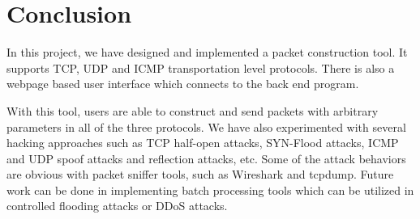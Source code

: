 \documentclass[12pt,letterpaper]{report}
\begin{document}
\chapter*{Conclusion}
In this project, we have designed and implemented a packet 
construction tool. It supports TCP, UDP and ICMP transportation 
level protocols. There is also a webpage based user interface 
which connects to the back end program.

With this tool, users are able to construct and send packets 
with arbitrary parameters in all of the three protocols. We 
have also experimented with several hacking approaches 
such as TCP half-open attacks, SYN-Flood attacks, ICMP 
and UDP spoof attacks and reflection attacks, etc. Some of 
the attack behaviors are obvious with packet sniffer tools, 
such as Wireshark and tcpdump. Future work can be done 
in implementing batch processing tools which can be 
utilized in controlled flooding attacks or DDoS attacks.



\end{document}
